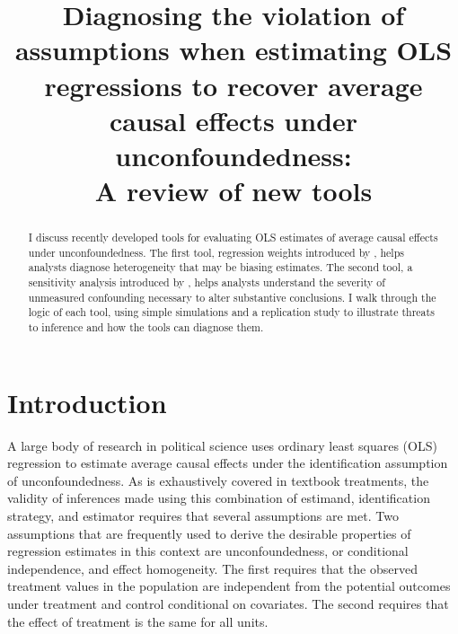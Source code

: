 \documentclass[hidelinks,11pt]{article}
\begin{document}

\setarab
\vocalize
\transtrue
\arabfalse
\title{Diagnosing the violation of assumptions when estimating OLS regressions to recover average causal effects under unconfoundedness: \\A review of new tools}
      \maketitle
\doublespacing


\pagestyle{fancy}
\fancyhf{}

\begin{abstract}
I discuss recently developed tools for evaluating OLS estimates of average causal effects under unconfoundedness. The first tool, regression weights introduced by \citet{aronowsamii2016}, helps analysts diagnose heterogeneity that may be biasing estimates. The second tool, a sensitivity analysis introduced by \citet{cinellihazlett2020}, helps analysts understand the severity of unmeasured confounding necessary to alter substantive conclusions. I walk through the logic of each tool, using simple simulations and a replication study to illustrate threats to inference and how the tools can diagnose them.

\end{abstract}

\section{Introduction}

A large body of research in political science uses ordinary least squares (OLS) regression to estimate average causal effects under the identification assumption of unconfoundedness. As is exhaustively covered in textbook treatments, the validity of inferences made using this combination of estimand, identification strategy, and estimator requires that several assumptions are met. Two assumptions that are frequently used to derive the desirable properties of regression estimates in this context are unconfoundedness, or conditional independence, and effect homogeneity. The first requires that the observed treatment values in the population are independent from the potential outcomes under treatment and control conditional on covariates. The second requires that the effect of treatment is the same for all units.
\end{document}
